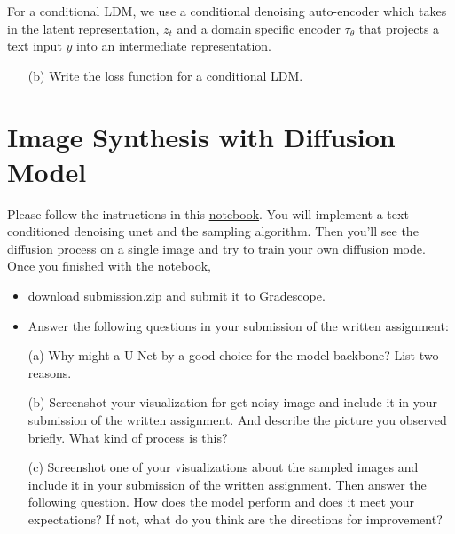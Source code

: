 \documentclass[a4paper]{article}
\begin{document}
For a conditional LDM, we use a conditional denoising auto-encoder which takes in the latent representation, \(z_t\) and a domain specific encoder \(\tau_{\theta}\) that projects a text input \(y\) into an intermediate representation.  
\begin{itemize}
    \item [(b)]
    Write the loss function for a conditional LDM.
   
\end{itemize}

\section{Image Synthesis with Diffusion Model}

Please follow the instructions in this \href{https://colab.research.google.com/drive/1mmyvwlYvAnnfIBIr29bMvOEnL2mUcPHm?usp=sharing}{notebook}. 
You will implement a text conditioned denoising unet and the sampling algorithm. Then you'll see the diffusion process on a single image and try to train your own diffusion mode. Once you finished with the notebook,
\begin{itemize}
    \item download submission.zip and submit it to Gradescope.

    \item Answer the following questions in your submission of the written assignment:
\end{itemize}

\begin{itemize}
    \item [(a)]
    Why might a U-Net by a good choice for the model backbone? List two reasons.


    \item [(b)]
    Screenshot your visualization for get noisy image and include it in your submission of the written assignment. And describe the picture you observed briefly. What kind of process is this?


    \item [(c)]
    Screenshot one of your visualizations about the sampled images and include it in your submission of the written assignment. Then answer the following question. How does the model perform and does it meet your expectations? If not, what do you think are the directions for improvement?

    
\end{itemize}
\end{document}
